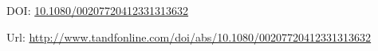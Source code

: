 \documentclass[a4paper,12pt]{article}
\begin{document}
\thispagestyle{empty}

\vspace{3cm}

\nocite{FDB-art-4}

\printbibliography

\vspace{3cm}
DOI: \href{https://doi.org/10.1080/00207720412331313632}{10.1080/00207720412331313632}

\vspace{1.5cm}
Url: \url{http://www.tandfonline.com/doi/abs/10.1080/00207720412331313632}

\newpage

\end{document}
